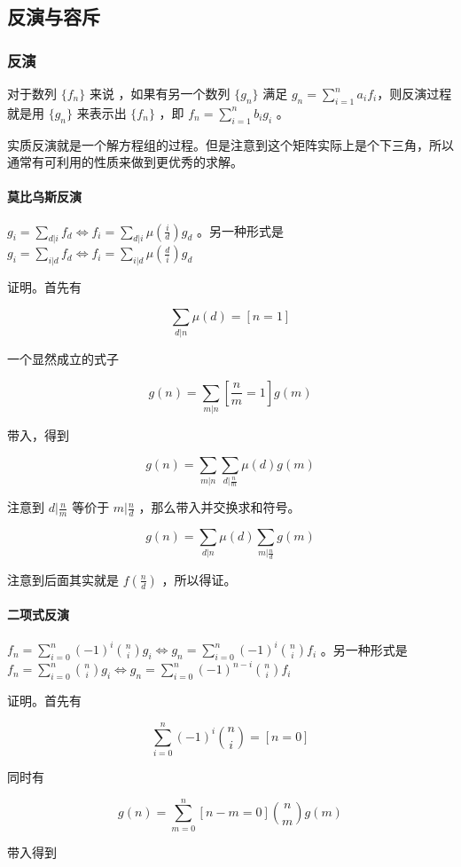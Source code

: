 \documentclass[UTF-8]{ctexart}
\begin{document}
	\subsection{反演与容斥}
	\subsubsection{反演}
	对于数列 $\{f_n\}$ 来说	，如果有另一个数列 $\{g_n\}$ 满足 $g_n=\sum_{i=1}^n a_i f_i$，则反演过程就是用 $\{g_n\}$ 来表示出 $\{f_n\}$ ，即 $f_n=\sum_{i=1}^n b_i g_i$ 。
	
	实质反演就是一个解方程组的过程。但是注意到这个矩阵实际上是个下三角，所以通常有可利用的性质来做到更优秀的求解。
	
	\paragraph{莫比乌斯反演} $g_i=\sum_{d|i} f_d \Leftrightarrow f_i=\sum_{d|i} \mu(\frac{i}{d}) g_d$ 。另一种形式是 $g_i=\sum_{i|d} f_d\Leftrightarrow f_i=\sum_{i|d} \mu(\frac{d}{i}) g_d$
	
	证明。首先有
	
	$$\sum_{d|n} \mu(d)=[n=1]$$
	
	一个显然成立的式子
	
	$$g(n)=\sum_{m|n} [\frac{n}{m}=1] g(m)$$
	
	带入，得到
	
	$$g(n)=\sum_{m|n}\sum_{d|\frac{n}{m}} \mu(d) g(m)$$
	
	注意到 $d|\frac{n}{m}$ 等价于 $m|\frac{n}{d}$ ，那么带入并交换求和符号。
	
	$$g(n)=\sum_{d|n}\mu(d)\sum_{m|\frac{n}{d}}g(m)$$
	
	注意到后面其实就是 $f(\frac{n}{d})$ ，所以得证。
	
	\paragraph{二项式反演} $f_n = \sum_{i=0}^n (-1)^i {n \choose i} g_i \Leftrightarrow g_n = \sum_{i=0}^n (-1)^i {n \choose i} f_i$ 。另一种形式是 $f_n = \sum_{i=0}^n {n \choose i} g_i \Leftrightarrow g_n = \sum_{i=0}^n (-1)^{n-i} {n \choose i} f_i$
	
	证明。首先有
	
	$$\sum_{i=0}^n(-1)^i\binom{n}{i}=[n=0]$$
	
	同时有
	
	$$g(n)=\sum_{m=0}^n[n-m=0]\binom{n}{m}g(m)$$
	
	带入得到
	
\end{document}
